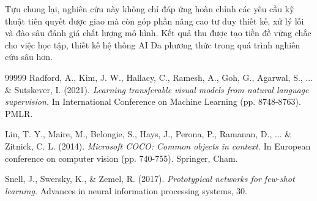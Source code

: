 \documentclass[a4paper]{article}
\theoremstyle{definition}
\begin{document}
Tựu chung lại, nghiên cứu này không chỉ đáp ứng hoàn chỉnh các yêu cầu kỹ thuật tiên quyết được giao mà còn góp phần nâng cao tư duy thiết kế, xử lý lỗi và đào sâu đánh giá chất lượng mô hình. Kết quả thu được tạo tiền đề vững chắc cho việc học tập, thiết kế hệ thống AI Đa phương thức trong quá trình nghiên cứu sâu hơn.


\begin{thebibliography}{99999}
	Radford, A., Kim, J. W., Hallacy, C., Ramesh, A., Goh, G., Agarwal, S., ... \& Sutskever, I. (2021).
		{\em Learning transferable visual models from natural language supervision.}
	In International Conference on Machine Learning (pp. 8748-8763). PMLR.

	Lin, T. Y., Maire, M., Belongie, S., Hays, J., Perona, P., Ramanan, D., ... \& Zitnick, C. L. (2014).
		{\em Microsoft COCO: Common objects in context.}
	In European conference on computer vision (pp. 740-755). Springer, Cham.

	Snell, J., Swersky, K., \& Zemel, R. (2017).
		{\em Prototypical networks for few-shot learning.}
	Advances in neural information processing systems, 30.




\end{thebibliography}
\end{document}
